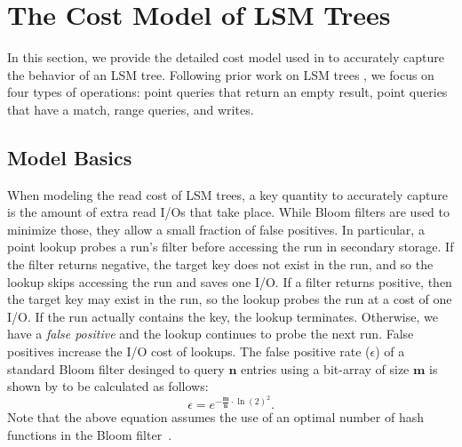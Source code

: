 
\section{The Cost Model of  LSM Trees}
\label{sec:tuning_lsm_trees}

In this section, we provide the detailed cost model used in {\Endure} to
    accurately capture the behavior of an LSM tree. 
Following prior work on LSM trees \cite{Dayan2018a, Luo2020}, we focus on four 
    types of operations: point queries that return an empty result, point 
    queries that have a match, range queries, and writes.

\subsection{Model Basics}

When modeling the read cost of LSM trees, a key quantity to accurately capture 
    is the amount of extra read I/Os that take place. 
While Bloom filters are used to minimize those, they allow a small fraction of 
    false positives. 
In particular, a point lookup probes a run's filter before accessing the run in 
    secondary storage. 
If the filter returns negative, the target key does not exist in the run, and 
    so the lookup skips accessing the run and saves one I/O.
If a filter returns positive, then the target key may exist in the run, so the 
    lookup probes the run at a cost of one I/O.
If the run actually contains the key, the lookup terminates.
Otherwise, we have a \emph{false positive} and the lookup continues to probe 
    the next run.
False positives increase the I/O cost of lookups. 
The false positive rate ($\epsilon$) of a standard Bloom filter desinged to 
query $\mathbf{n}$ entries using a bit-array of size $\mathbf{m}$ is shown by 
    \cite{Tarkoma2012} to be calculated as follows:
\begin{equation*} 
\label{eq:bloom}
    \epsilon = e^{-\frac{\mathbf{m}}{\mathbf{n}} \cdot \ln(2)^2}.
\end{equation*}
Note that the above equation assumes the use of an optimal number of hash 
    functions in the Bloom filter~\cite{enwiki:1025193696}.

